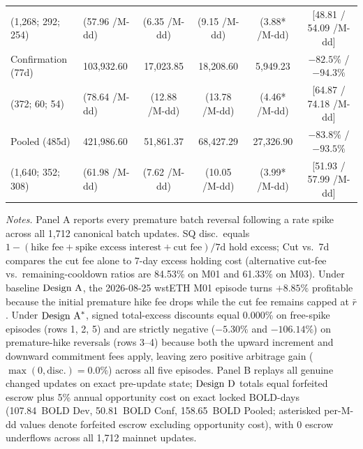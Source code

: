 \begin{table}[!htbp]
{\begin{tabular}{@{}llrrrrrrrr@{}}
\quad (1,268; 292; 254) & (57.96 /M-dd) & \multicolumn{2}{c}{(6.35 /M-dd)} & \multicolumn{2}{c}{(9.15 /M-dd)} & \multicolumn{2}{c}{(3.88* /M-dd)} & \multicolumn{2}{c}{[48.81 / 54.09 /M-dd]} \\
Confirmation (77d) & 103,932.60 & \multicolumn{2}{c}{17,023.85} & \multicolumn{2}{c}{18,208.60} & \multicolumn{2}{c}{5,949.23} & \multicolumn{2}{c}{$-82.5\%$ / $-94.3\%$} \\
\quad (372; 60; 54) & (78.64 /M-dd) & \multicolumn{2}{c}{(12.88 /M-dd)} & \multicolumn{2}{c}{(13.78 /M-dd)} & \multicolumn{2}{c}{(4.46* /M-dd)} & \multicolumn{2}{c}{[64.87 / 74.18 /M-dd]} \\
Pooled (485d) & 421,986.60 & \multicolumn{2}{c}{51,861.37} & \multicolumn{2}{c}{68,427.29} & \multicolumn{2}{c}{27,326.90} & \multicolumn{2}{c}{$-83.8\%$ / $-93.5\%$} \\
\quad (1,640; 352; 308) & (61.98 /M-dd) & \multicolumn{2}{c}{(7.62 /M-dd)} & \multicolumn{2}{c}{(10.05 /M-dd)} & \multicolumn{2}{c}{(3.99* /M-dd)} & \multicolumn{2}{c}{[51.93 / 57.99 /M-dd]} \\
\bottomrule
\end{tabular}}
\par\vspace{4pt}\begin{minipage}{\textwidth}\footnotesize\setlength{\parskip}{0pt}\textit{Notes.} Panel A reports every premature batch reversal following a rate spike across all 1,712 canonical batch updates. SQ disc.\ equals $1 - (\text{hike fee} + \text{spike excess interest} + \text{cut fee}) / \text{7d hold excess}$; Cut vs.\ 7d compares the cut fee alone to 7-day excess holding cost (alternative cut-fee vs.\ remaining-cooldown ratios are 84.53\% on M01 and 61.33\% on M03). Under baseline $\text{Design A}$, the 2026-08-25 wstETH M01 episode turns $+8.85\%$ profitable because the initial premature hike fee drops while the cut fee remains capped at $\bar{r}$. Under $\text{Design A}^*$, signed total-excess discounts equal 0.000\% on free-spike episodes (rows 1, 2, 5) and are strictly negative ($-5.30\%$ and $-106.14\%$) on premature-hike reversals (rows 3--4) because both the upward increment and downward commitment fees apply, leaving zero positive arbitrage gain ($\max(0, \text{disc.}) = 0.0\%$) across all five episodes. Panel B replays all genuine changed updates on exact pre-update state; $\text{Design D}$ totals equal forfeited escrow plus 5\% annual opportunity cost on exact locked BOLD-days (107.84~BOLD Dev, 50.81~BOLD Conf, 158.65~BOLD Pooled; asterisked per-M-dd values denote forfeited escrow excluding opportunity cost), with 0 escrow underflows across all 1,712 mainnet updates.
\end{minipage}
\end{table}

